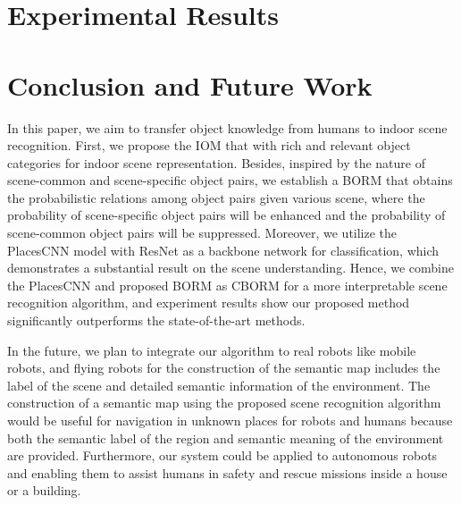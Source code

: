 \documentclass[letterpaper, 10 pt, conference]{ieeeconf}  %
\begin{document}
\section{Experimental Results}
\label{sec:exp}



\section{Conclusion and Future Work}
\label{sec:conclusion}
In this paper, we aim to transfer object knowledge from humans to indoor scene recognition. First, we propose the IOM that with rich and relevant object categories for indoor scene representation. Besides, inspired by the nature of scene-common and scene-specific object pairs, we establish a BORM that obtains the probabilistic relations among object pairs given various scene, where the probability of scene-specific object pairs will be enhanced and the probability of scene-common object pairs will be suppressed.  
Moreover, we utilize the PlacesCNN model with ResNet as a backbone network for classification, which demonstrates a substantial result on the scene understanding. Hence, we combine the PlacesCNN and proposed BORM as CBORM for a more interpretable scene recognition algorithm, and experiment results show our proposed method significantly outperforms the state-of-the-art methods. 

In the future, we plan to integrate our algorithm to real robots like mobile robots, and flying robots for the construction of the semantic map includes the label of the scene and detailed semantic information of the environment. The construction of a semantic map using the proposed scene recognition algorithm would be useful for navigation in unknown places for robots and humans because both the semantic label of the region and semantic meaning of the environment are provided. Furthermore, our system could be applied to autonomous robots and enabling them to assist humans in safety and rescue missions inside a house or a building.






%

\end{document}
